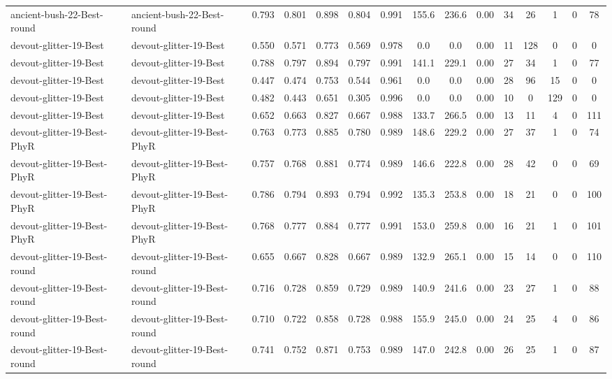 \begin{table*}[p]
{\begin{tabular}{llccccccccccccc}
      ancient-bush-22-Best-round & ancient-bush-22-Best-round & 0.793 & 0.801 & 0.898 & 0.804 & 0.991 & 155.6 & 236.6 & 0.00 & 34 & 26 & 1 & 0 & 78 \\
      devout-glitter-19-Best & devout-glitter-19-Best & 0.550 & 0.571 & 0.773 & 0.569 & 0.978 & 0.0 & 0.0 & 0.00 & 11 & 128 & 0 & 0 & 0 \\
      devout-glitter-19-Best & devout-glitter-19-Best & 0.788 & 0.797 & 0.894 & 0.797 & 0.991 & 141.1 & 229.1 & 0.00 & 27 & 34 & 1 & 0 & 77 \\
      devout-glitter-19-Best & devout-glitter-19-Best & 0.447 & 0.474 & 0.753 & 0.544 & 0.961 & 0.0 & 0.0 & 0.00 & 28 & 96 & 15 & 0 & 0 \\
      devout-glitter-19-Best & devout-glitter-19-Best & 0.482 & 0.443 & 0.651 & 0.305 & 0.996 & 0.0 & 0.0 & 0.00 & 10 & 0 & 129 & 0 & 0 \\
      devout-glitter-19-Best & devout-glitter-19-Best & 0.652 & 0.663 & 0.827 & 0.667 & 0.988 & 133.7 & 266.5 & 0.00 & 13 & 11 & 4 & 0 & 111 \\
      devout-glitter-19-Best-PhyR & devout-glitter-19-Best-PhyR & 0.763 & 0.773 & 0.885 & 0.780 & 0.989 & 148.6 & 229.2 & 0.00 & 27 & 37 & 1 & 0 & 74 \\
      devout-glitter-19-Best-PhyR & devout-glitter-19-Best-PhyR & 0.757 & 0.768 & 0.881 & 0.774 & 0.989 & 146.6 & 222.8 & 0.00 & 28 & 42 & 0 & 0 & 69 \\
      devout-glitter-19-Best-PhyR & devout-glitter-19-Best-PhyR & 0.786 & 0.794 & 0.893 & 0.794 & 0.992 & 135.3 & 253.8 & 0.00 & 18 & 21 & 0 & 0 & 100 \\
      devout-glitter-19-Best-PhyR & devout-glitter-19-Best-PhyR & 0.768 & 0.777 & 0.884 & 0.777 & 0.991 & 153.0 & 259.8 & 0.00 & 16 & 21 & 1 & 0 & 101 \\
      devout-glitter-19-Best-round & devout-glitter-19-Best-round & 0.655 & 0.667 & 0.828 & 0.667 & 0.989 & 132.9 & 265.1 & 0.00 & 15 & 14 & 0 & 0 & 110 \\
      devout-glitter-19-Best-round & devout-glitter-19-Best-round & 0.716 & 0.728 & 0.859 & 0.729 & 0.989 & 140.9 & 241.6 & 0.00 & 23 & 27 & 1 & 0 & 88 \\
      devout-glitter-19-Best-round & devout-glitter-19-Best-round & 0.710 & 0.722 & 0.858 & 0.728 & 0.988 & 155.9 & 245.0 & 0.00 & 24 & 25 & 4 & 0 & 86 \\
      devout-glitter-19-Best-round & devout-glitter-19-Best-round & 0.741 & 0.752 & 0.871 & 0.753 & 0.989 & 147.0 & 242.8 & 0.00 & 26 & 25 & 1 & 0 & 87 \\

\end{tabular}}
\end{table*}
